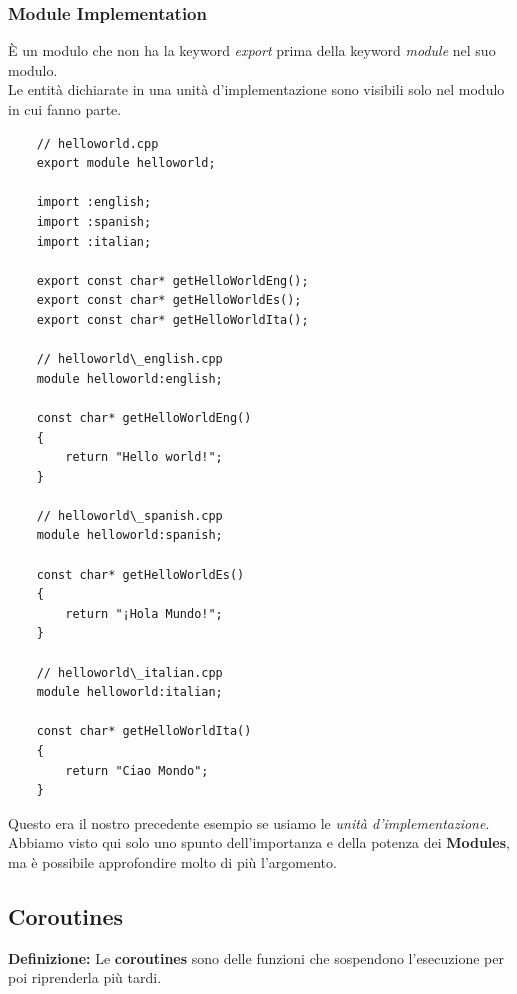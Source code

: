 \subsubsection{Module Implementation}

\textsf{\small È un modulo che non ha la keyword \emph{export} prima della keyword \emph{module} nel suo modulo.} \\

\textsf{\small Le entità dichiarate in una unità d'implementazione sono visibili solo nel modulo in cui fanno parte.} \\

\begin{lstlisting}
	// helloworld.cpp
	export module helloworld;
	
	import :english;
	import :spanish;
	import :italian;
	
	export const char* getHelloWorldEng();
	export const char* getHelloWorldEs();
	export const char* getHelloWorldIta();
	
	// helloworld\_english.cpp
	module helloworld:english;
	
	const char* getHelloWorldEng() 
	{
		return "Hello world!";
	}

	// helloworld\_spanish.cpp
	module helloworld:spanish;
	
	const char* getHelloWorldEs() 
	{
		return "¡Hola Mundo!";
	}

	// helloworld\_italian.cpp
	module helloworld:italian;
	
	const char* getHelloWorldIta() 
	{
		return "Ciao Mondo";
	}
\end{lstlisting}

\textsf{\small Questo era il nostro precedente esempio se usiamo le \emph{unità d'implementazione}.} \\

\textsf{\small Abbiamo visto qui solo uno spunto dell'importanza e della potenza dei \textbf{Modules}, ma è possibile approfondire molto di più l'argomento.} \\

\newpage

\subsection{Coroutines}

\textsf{\small \textbf{Definizione: } Le \textbf{coroutines} sono delle funzioni che sospendono l'esecuzione per poi riprenderla più tardi.} \\

